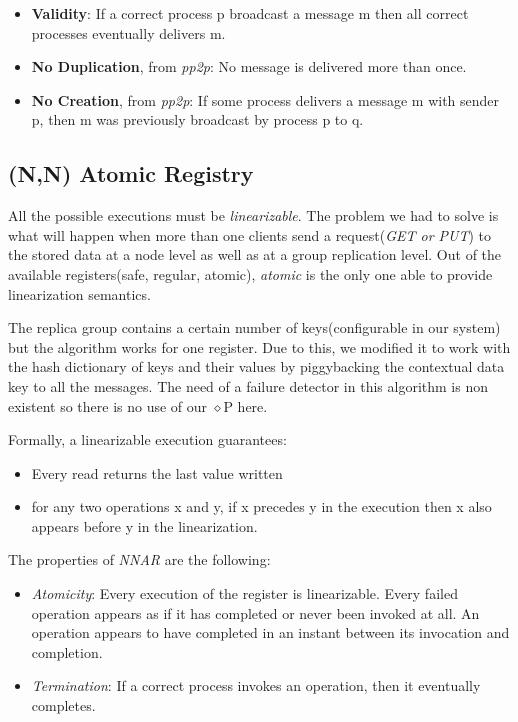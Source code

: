 \documentclass[a4paper, 11pt]{article}
\begin{document}
\begin{itemize}
	\item \textbf{Validity}: If a correct process p broadcast a message m then all correct processes eventually delivers m.
	\item \textbf{No Duplication}, from \textit{pp2p}: No message is delivered more than once.
	\item \textbf{No Creation}, from \textit{pp2p}: If some process delivers a message m with sender p, then m was previously broadcast by process p to q.
\end{itemize}


\subsection{(N,N) Atomic Registry}

All the possible executions must be \textit{linearizable}. The problem we had to solve is what will happen when more than one clients send a request(\textit{GET or PUT}) to the stored data at a node level as well as at a group replication level. Out of the available registers(safe, regular, atomic), \textit{atomic} is the only one able to provide linearization semantics. \par

The replica group contains a certain number of keys(configurable in our system) but the algorithm works for one register. Due to this, we modified it to work with the hash dictionary of keys and their values by piggybacking the contextual data key to all the messages. The need of a failure detector in this algorithm is non existent so there is no use of our $\diamond$P here. \par

Formally, a linearizable execution guarantees:
\begin{itemize}
	\item Every read returns the last value written
	\item for any two operations x and y, if x precedes y in the execution then x also appears before y in the linearization.
\end{itemize}

The properties of \textit{NNAR} are the following:
\begin{itemize}
	\item \textit{Atomicity}: Every execution of the register is linearizable. Every failed operation appears as if it has completed or never been invoked at all. An operation appears to have completed in an instant between its invocation and completion.
	\item \textit{Termination}: If a correct process invokes an operation, then it eventually completes.
	
\end{itemize}
\end{document}
